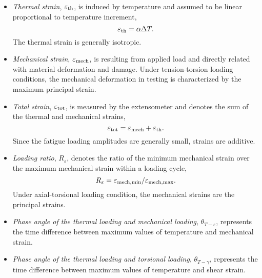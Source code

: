 \begin{itemize}
  \item {\em Thermal strain}, $\varepsilon_{\rm{th}}$, is induced by temperature and assumed to be linear proportional to temperature increment,
  \begin{equation}
  \varepsilon_{\rm{th}}=\alpha\Delta T.
  \label{Equ:thermal_strain}
  \end{equation}
  The thermal strain is generally isotropic.
  \item {\em Mechanical strain}, $\varepsilon_{\rm{mech}}$, is resulting from applied load and directly related with material deformation and damage. Under tension-torsion loading conditions, the mechanical deformation in testing is characterized by the maximum principal strain.
  \item {\em Total strain}, $\varepsilon_{\rm{tot}}$, is measured by the extensometer and denotes the sum of the thermal and mechanical strains,
  \begin{equation}
  \varepsilon_{\rm{tot}}=\varepsilon_{\rm{mech}}+\varepsilon_{\rm{th}}.
  \label{Equ:total_strain}
  \end{equation}
  Since the fatigue loading amplitudes are generally small, strains are additive.
  \item {\em Loading ratio}, $R_{\varepsilon}$, denotes the ratio of the minimum mechanical strain over the maximum mechanical strain within a loading cycle,
  \begin{equation}
  R_{\varepsilon}=\varepsilon_{\rm{mech,min}}/\varepsilon_{\rm{mech,max}}.
  \end{equation}
  Under axial-torsional loading condition, the mechanical strains are the principal strains.
  \item {\em Phase angle of the thermal loading and mechanical loading}, $\theta_{T-\varepsilon}$, represents the time difference between maximum values of temperature and mechanical strain.
  \item {\em Phase angle of the thermal loading and torsional loading}, $\theta_{T-\gamma}$, represents the time difference between maximum values of temperature and shear strain.

\end{itemize}
